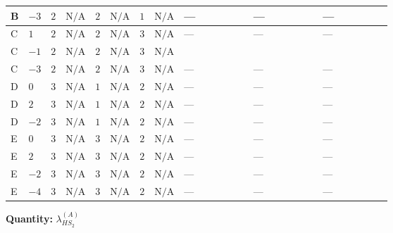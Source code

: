 \documentclass[8pt]{article}
\begin{document}
\begin{landscape}
\begin{longtable}{@{}llcccccc >{\raggedright\arraybackslash}p{0.21\linewidth} >{\raggedright\arraybackslash}p{0.21\linewidth} >{\raggedright\arraybackslash}p{0.21\linewidth}@{}}
\midrule
B & $-3$ & $2$ & $\text{N/A}$ & $2$ & $\text{N/A}$ & $1$ & $\text{N/A}$ & --- & --- & --- \\
\midrule
C & $1$ & $2$ & $\text{N/A}$ & $2$ & $\text{N/A}$ & $3$ & $\text{N/A}$ & --- & --- & --- \\
\midrule
C & $-1$ & $2$ & $\text{N/A}$ & $2$ & $\text{N/A}$ & $3$ & $\text{N/A}$ & \scriptsize\adjustbox{max width=\linewidth}{$\begin{gathered} -4 {\lambda_{10}} (\left({\lambda_{H H^\dagger S_1^\dagger S_2^\dagger}^{\rm Cross}}\right)^{*}+\left({\lambda_{X_{17}}^{(1)}}\right)^{*})\end{gathered}$} & \scriptsize\adjustbox{max width=\linewidth}{$\begin{gathered} -4 {\lambda_{H H^\dagger S_1^\dagger S_2^\dagger}^{\rm Cross}} (2 \left({\lambda_{H H^\dagger S_1^\dagger S_2^\dagger}^{\rm Cross}}\right)^{*}+\left({\lambda_{10}}\right)^{*})\end{gathered}$} & \scriptsize\adjustbox{max width=\linewidth}{$\begin{gathered} +64 {\lambda_{8}} \left({\lambda_{8}}\right)^{*}\end{gathered}$} \\
\midrule
C & $-3$ & $2$ & $\text{N/A}$ & $2$ & $\text{N/A}$ & $3$ & $\text{N/A}$ & --- & --- & --- \\
\midrule
D & $0$ & $3$ & $\text{N/A}$ & $1$ & $\text{N/A}$ & $2$ & $\text{N/A}$ & --- & --- & --- \\
\midrule
D & $2$ & $3$ & $\text{N/A}$ & $1$ & $\text{N/A}$ & $2$ & $\text{N/A}$ & --- & --- & --- \\
\midrule
D & $-2$ & $3$ & $\text{N/A}$ & $1$ & $\text{N/A}$ & $2$ & $\text{N/A}$ & --- & --- & --- \\
\midrule
E & $0$ & $3$ & $\text{N/A}$ & $3$ & $\text{N/A}$ & $2$ & $\text{N/A}$ & --- & --- & --- \\
\midrule
E & $2$ & $3$ & $\text{N/A}$ & $3$ & $\text{N/A}$ & $2$ & $\text{N/A}$ & --- & --- & --- \\
\midrule
E & $-2$ & $3$ & $\text{N/A}$ & $3$ & $\text{N/A}$ & $2$ & $\text{N/A}$ & --- & --- & --- \\
\midrule
E & $-4$ & $3$ & $\text{N/A}$ & $3$ & $\text{N/A}$ & $2$ & $\text{N/A}$ & --- & --- & --- \\
\midrule
\bottomrule
\end{longtable}
\clearpage
\noindent\textbf{Quantity: }$\lambda_{HS_2}^{(A)}$\par\smallskip

\end{landscape}
\end{document}

